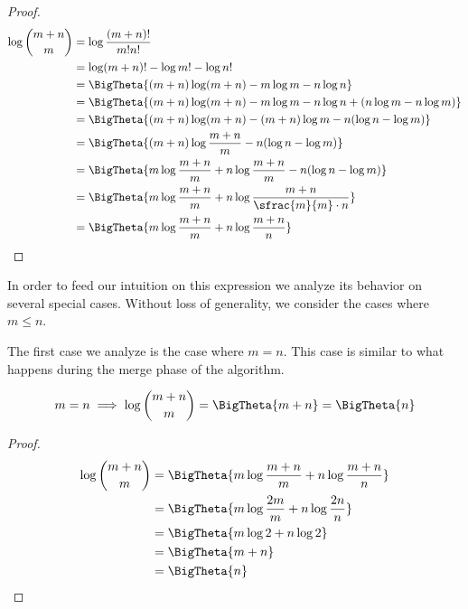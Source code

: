 \begin{proof}
\begin{align*}
\log\binom{m+n}{m} &= \log\frac{(m+n)!}{m!n!}\\
&= \log(m+n)! - \log m! - \log n!\\
&= \BigTheta{(m+n) \log(m+n) - m \log m - n \log n}\\
&= \BigTheta{(m+n) \log(m+n) - m \log m - n \log n + (n \log m - n \log m)}\\
&= \BigTheta{(m+n) \log(m+n) - (m+n) \log m - n (\log n - \log m)}\\
&= \BigTheta{(m+n) \log\frac{m+n}{m} - n (\log n - \log m)}\\
&= \BigTheta{m \log\frac{m+n}{m} + n \log\frac{m+n}{m} - n (\log n - \log m)}\\
&= \BigTheta{m \log\frac{m+n}{m} + n \log\frac{m+n}{\sfrac{m}{m} \cdot n}}\\
&= \BigTheta{m \log\frac{m+n}{m} + n \log\frac{m+n}{n}}\\
\end{align*}
\end{proof}

In order to feed our intuition on this expression we analyze its behavior
on several special cases. Without loss of generality, we consider the cases
where \(m \leq n\).

The first case we analyze is the case where $m = n$. This case is similar
to what happens during the merge phase of the \mergesort algorithm.

\begin{lemma}
\begin{align*}
m = n &\implies \log\binom{m+n}{m} = \BigTheta{m + n} = \BigTheta{n}\\
\end{align*}
\end{lemma}

\begin{proof}
\begin{align*}
\log\binom{m+n}{m} &= \BigTheta{m \log\frac{m+n}{m} + n \log\frac{m+n}{n}}\\
&= \BigTheta{m \log\frac{2m}{m} + n \log\frac{2n}{n}}\\
&= \BigTheta{m \log 2 + n \log 2}\\
&= \BigTheta{m + n}\\
&= \BigTheta{n}\\
\end{align*}
\end{proof}

